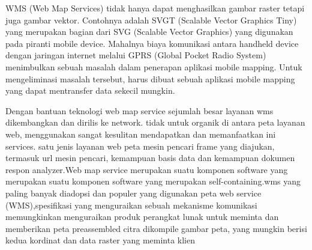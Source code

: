 WMS (Web Map Services) tidak hanya dapat menghasilkan gambar raster tetapi juga gambar vektor. Contohnya  adalah SVGT (Scalable Vector
Graphics Tiny) yang merupakan bagian dari SVG (Scalable Vector Graphics) yang digunakan pada piranti mobile device. Mahalnya biaya
komunikasi antara handheld device dengan jaringan internet melalui GPRS (Global Pocket Radio System) menimbulkan sebuah masalah dalam
penerapan aplikasi mobile mapping. Untuk mengeliminasi masalah tersebut, harus dibuat sebuah aplikasi mobile mapping yang dapat mentransfer data sekecil mungkin.

Dengan bantuan teknologi web map service  sejumlah besar layanan wms dikembangkan dan dirilis ke network. tidak untuk organik di antara
peta layanan web, menggunakan sangat kesulitan mendapatkan dan memanfaatkan ini services. satu jenis layanan web peta mesin pencari
frame yang diajukan, termasuk url mesin pencari, kemampuan basis data dan kemampuan dokumen respon analyzer.Web map service merupakan suatu komponen software yang merupakan suatu komponen software yang merupakan self-containing.wms yang paling banyak  diadopsi dan populer yang digunakan peta web service (WMS),spesifikasi yang menguraikan sebuah mekanisme komunikasi memungkinkan menguraikan produk perangkat lunak untuk meminta dan memberikan peta preassembled citra dikompile gambar peta, yang mungkin berisi kedua kordinat dan data raster yang meminta klien




  
  
